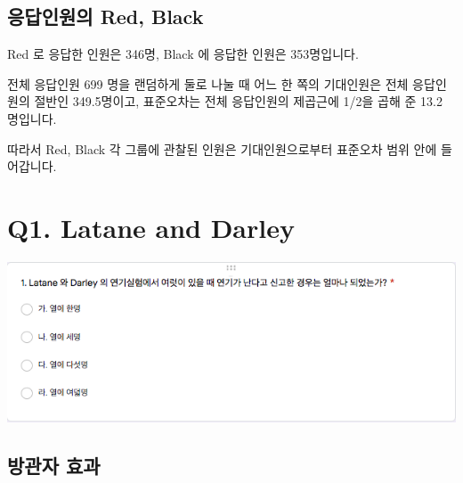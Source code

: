 \documentclass[
]{book}
\begin{document}
\subsection{응답인원의 Red, Black}\label{uxc751uxb2f5uxc778uxc6d0uxc758-red-black-17}

Red 로 응답한 인원은 346명, Black 에 응답한 인원은 353명입니다.

전체 응답인원 699 명을 랜덤하게 둘로 나눌 때 어느 한 쪽의 기대인원은 전체 응답인원의 절반인 349.5명이고, 표준오차는 전체 응답인원의 제곱근에 1/2을 곱해 준 13.2 명입니다.

따라서 Red, Black 각 그룹에 관찰된 인원은 기대인원으로부터 표준오차 범위 안에 들어갑니다.

\section{Q1. Latane and Darley}\label{q1.-latane-and-darley}

\includegraphics[width=0.9\linewidth]{./pics/Quiz201109_01}

\subsection{방관자 효과}\label{uxbc29uxad00uxc790-uxd6a8uxacfc}
\end{document}
